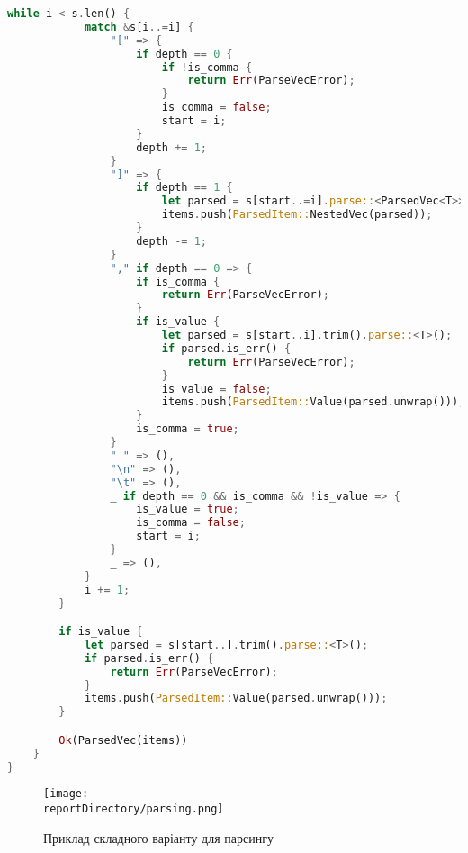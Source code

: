 \begin{lstlisting}[language=Rust, style=colouredRust]
        while i < s.len() {
            match &s[i..=i] {
                "[" => {
                    if depth == 0 {
                        if !is_comma {
                            return Err(ParseVecError);
                        }
                        is_comma = false;
                        start = i;
                    }
                    depth += 1;
                }
                "]" => {
                    if depth == 1 {
                        let parsed = s[start..=i].parse::<ParsedVec<T>>()?;
                        items.push(ParsedItem::NestedVec(parsed));
                    }
                    depth -= 1;
                }
                "," if depth == 0 => {
                    if is_comma {
                        return Err(ParseVecError);
                    }
                    if is_value {
                        let parsed = s[start..i].trim().parse::<T>();
                        if parsed.is_err() {
                            return Err(ParseVecError);
                        }
                        is_value = false;
                        items.push(ParsedItem::Value(parsed.unwrap()));
                    }
                    is_comma = true;
                }
                " " => (),
                "\n" => (),
                "\t" => (),
                _ if depth == 0 && is_comma && !is_value => {
                    is_value = true;
                    is_comma = false;
                    start = i;
                }
                _ => (),
            }
            i += 1;
        }

        if is_value {
            let parsed = s[start..].trim().parse::<T>();
            if parsed.is_err() {
                return Err(ParseVecError);
            }
            items.push(ParsedItem::Value(parsed.unwrap()));
        }

        Ok(ParsedVec(items))
    }
}    
\end{lstlisting}

\begin{figure}[h!]
    \centering
    \texttt{[image: \\reportDirectory/parsing.png]}
    \caption{Приклад складного варіанту для парсингу}
    \label{fig:task}
\end{figure}


\newpage
